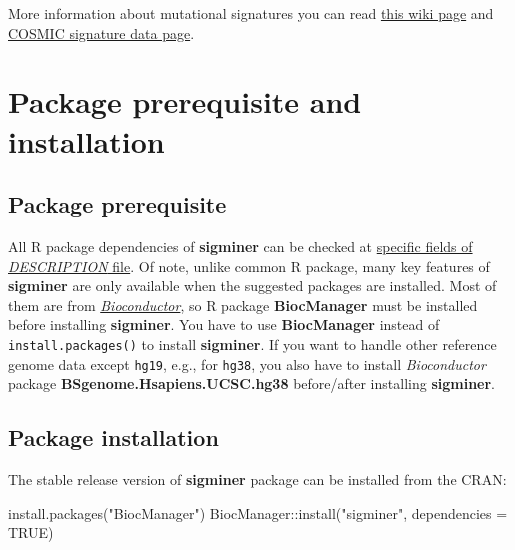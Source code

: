 \documentclass[
  12pt,
  a4paper,
  twoside]{book}
\newenvironment{Shaded}{\begin{snugshade}}{\end{snugshade}}
\newcommand{\AttributeTok}[1]{\textcolor[rgb]{0.77,0.63,0.00}{#1}}
\newcommand{\ConstantTok}[1]{\textcolor[rgb]{0.00,0.00,0.00}{#1}}
\newcommand{\FunctionTok}[1]{\textcolor[rgb]{0.00,0.00,0.00}{#1}}
\newcommand{\NormalTok}[1]{#1}
\newcommand{\SpecialCharTok}[1]{\textcolor[rgb]{0.00,0.00,0.00}{#1}}
\newcommand{\StringTok}[1]{\textcolor[rgb]{0.31,0.60,0.02}{#1}}
\begin{document}
More information about mutational signatures you can read \href{https://en.wikipedia.org/wiki/Mutational_signatures}{this wiki page}
and \href{https://cancer.sanger.ac.uk/signatures/}{COSMIC signature data page}.

\hypertarget{prerequisite}{%
\chapter{Package prerequisite and installation}\label{prerequisite}}

\hypertarget{package-prerequisite}{%
\section{Package prerequisite}\label{package-prerequisite}}

All R package dependencies of \textbf{sigminer} can be checked at \href{https://github.com/ShixiangWang/sigminer/blob/4a10d0811cb3bcb02dbbff73ed1c218954bf9b42/DESCRIPTION\#L45-L100}{specific fields of \emph{DESCRIPTION} file}.
Of note, unlike common R package, many key features of \textbf{sigminer} are only available when the suggested packages are installed.
Most of them are from \href{http://bioconductor.org/}{\emph{Bioconductor}}, so R package \textbf{BiocManager} must be installed
before installing \textbf{sigminer}. You have to use \textbf{BiocManager} instead of \texttt{install.packages()} to install \textbf{sigminer}.
If you want to handle other reference genome data except \texttt{hg19}, e.g., for \texttt{hg38}, you also have to install \emph{Bioconductor}
package \textbf{BSgenome.Hsapiens.UCSC.hg38} before/after installing \textbf{sigminer}.

\hypertarget{package-installation}{%
\section{Package installation}\label{package-installation}}

The stable release version of \textbf{sigminer} package can be installed from the CRAN:

\begin{Shaded}
\begin{Highlighting}[]
\FunctionTok{install.packages}\NormalTok{(}\StringTok{"BiocManager"}\NormalTok{)}
\NormalTok{BiocManager}\SpecialCharTok{::}\FunctionTok{install}\NormalTok{(}\StringTok{"sigminer"}\NormalTok{, }\AttributeTok{dependencies =} \ConstantTok{TRUE}\NormalTok{)}
\end{Highlighting}
\end{Shaded}
\end{document}
